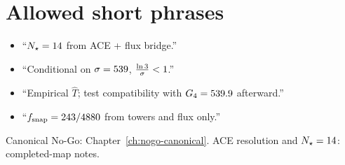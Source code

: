 {\section{Allowed short phrases}

\begin{itemize}
  \item ``\(N_{\star}=14\) from ACE + flux bridge.''
  \item ``Conditional on \(\sigma=539\), \(\frac{\ln 3}{\sigma}<1\).''
  \item ``Empirical \(\hat T\); test compatibility with \(G_{4}=539.9\) afterward.''
  \item ``\(f_{\mathrm{snap}}=243/4880\) from towers and flux only.''
\end{itemize}

\noindent
Canonical No-Go: Chapter~\ref{ch:nogo-canonical}.
ACE resolution and \(N_{\star}=14\): completed-map notes.
}%
